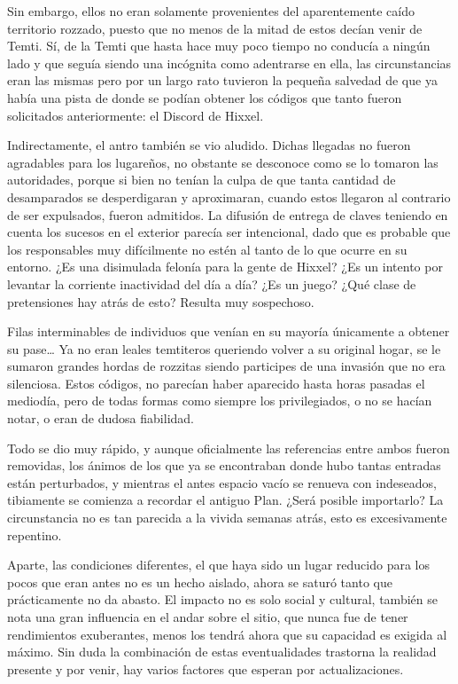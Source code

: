 \documentclass[
]{book}
\begin{document}
Sin embargo, ellos no eran solamente provenientes del aparentemente caído territorio rozzado, puesto que no menos de la mitad de estos decían venir de Temti. Sí, de la Temti que hasta hace muy poco tiempo no conducía a ningún lado y que seguía siendo una incógnita como adentrarse en ella, las circunstancias eran las mismas pero por un largo rato tuvieron la pequeña salvedad de que ya había una pista de donde se podían obtener los códigos que tanto fueron solicitados anteriormente: el Discord de Hixxel.

Indirectamente, el antro también se vio aludido. Dichas llegadas no fueron agradables para los lugareños, no obstante se desconoce como se lo tomaron las autoridades, porque si bien no tenían la culpa de que tanta cantidad de desamparados se desperdigaran y aproximaran, cuando estos llegaron al contrario de ser expulsados, fueron admitidos. La difusión de entrega de claves teniendo en cuenta los sucesos en el exterior parecía ser intencional, dado que es probable que los responsables muy difícilmente no estén al tanto de lo que ocurre en su entorno. ¿Es una disimulada felonía para la gente de Hixxel? ¿Es un intento por levantar la corriente inactividad del día a día? ¿Es un juego? ¿Qué clase de pretensiones hay atrás de esto? Resulta muy sospechoso.

Filas interminables de individuos que venían en su mayoría únicamente a obtener su pase\ldots{} Ya no eran leales temtiteros queriendo volver a su original hogar, se le sumaron grandes hordas de rozzitas siendo participes de una invasión que no era silenciosa. Estos códigos, no parecían haber aparecido hasta horas pasadas el mediodía, pero de todas formas como siempre los privilegiados, o no se hacían notar, o eran de dudosa fiabilidad.

Todo se dio muy rápido, y aunque oficialmente las referencias entre ambos fueron removidas, los ánimos de los que ya se encontraban donde hubo tantas entradas están perturbados, y mientras el antes espacio vacío se renueva con indeseados, tibiamente se comienza a recordar el antiguo Plan. ¿Será posible importarlo? La circunstancia no es tan parecida a la vivida semanas atrás, esto es excesivamente repentino.

Aparte, las condiciones diferentes, el que haya sido un lugar reducido para los pocos que eran antes no es un hecho aislado, ahora se saturó tanto que prácticamente no da abasto. El impacto no es solo social y cultural, también se nota una gran influencia en el andar sobre el sitio, que nunca fue de tener rendimientos exuberantes, menos los tendrá ahora que su capacidad es exigida al máximo. Sin duda la combinación de estas eventualidades trastorna la realidad presente y por venir, hay varios factores que esperan por actualizaciones.
\end{document}
